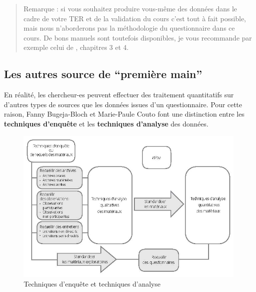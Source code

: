 \documentclass[
  french,
]{book}
\begin{document}
\begin{quote}
Remarque : si vous souhaitez produire vous-même des données dans le cadre de votre TER et de la validation du cours c'est tout à fait possible, mais nous n'aborderons pas la méthodologie du questionnaire dans ce cours. De bons manuels sont toutefois disponibles, je vous recommande par exemple celui de \citet{bugeja-bloch2021}, chapitres 3 et 4.
\end{quote}

\hypertarget{les-autres-source-de-premiuxe8re-main}{%
\subsection{Les autres source de ``première main''}\label{les-autres-source-de-premiuxe8re-main}}

En réalité, les chercheur-es peuvent effectuer des traitement quantitatifs sur d'autres types de sources que les données issues d'un questionnaire. Pour cette raison, Fanny Bugeja-Bloch et Marie-Paule Couto font une distinction entre les \textbf{techniques d'enquête} et les \textbf{techniques d'analyse} des données.

\begin{figure}
\centering
\includegraphics{images/techniquesenquete.jpg}
\caption{Techniques d'enquête et techniques d'analyse \citep{bugeja-bloch2021}}
\end{figure}
\end{document}
